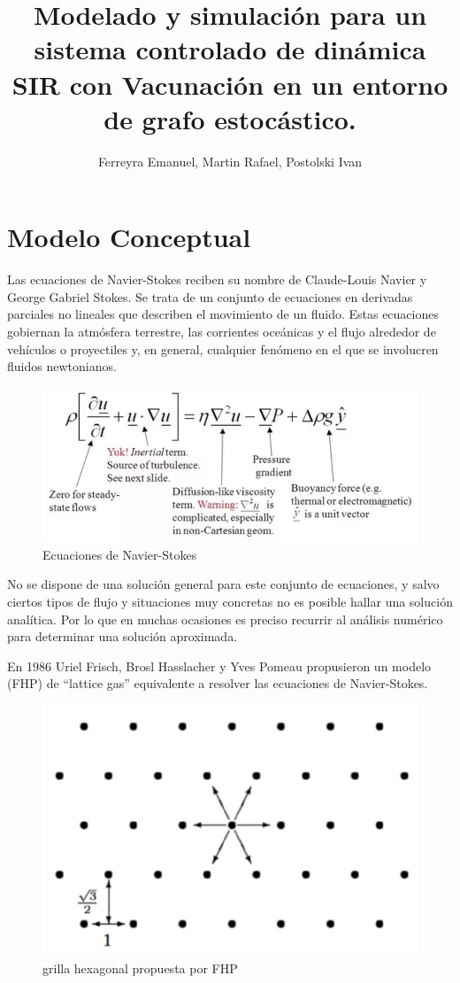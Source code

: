 \documentclass[10pt,a4paper]{article}
\author{Ferreyra Emanuel, Martin Rafael, Postolski Ivan}
\title{Modelado y simulación para un sistema controlado de din\'amica SIR con Vacunación en un entorno de grafo estoc\'astico.}
\begin{document}


\bigskip


\part*{Modelo Conceptual}
Las ecuaciones de Navier-Stokes reciben su nombre de Claude-Louis Navier y George Gabriel Stokes. Se trata de un conjunto de ecuaciones en derivadas parciales no lineales que describen el movimiento de un fluido. Estas ecuaciones gobiernan la atm\'osfera terrestre, las corrientes oce\'anicas y el flujo alrededor de veh\'iculos o proyectiles y, en general, cualquier fen\'omeno en el que se involucren fluidos newtonianos. 

\begin{figure}[H]
\centering
\includegraphics[scale=0.4]{NS}
\caption{Ecuaciones de Navier-Stokes}
\end{figure}

No se dispone de una soluci\'on general para este conjunto de ecuaciones, y salvo ciertos tipos de flujo y situaciones muy concretas no es posible hallar una soluci\'on anal\'itica. Por lo que en muchas ocasiones es preciso recurrir al an\'alisis numérico para determinar una soluci\'on aproximada.

En 1986 Uriel Frisch, Brosl Hasslacher y Yves Pomeau propusieron un modelo (FHP) de ``lattice gas'' equivalente a resolver las ecuaciones de Navier-Stokes.

\begin{figure}[H]
\centering
\includegraphics[scale=0.4]{grilla}
\caption{grilla hexagonal propuesta por FHP}
\end{figure}
\end{document}
